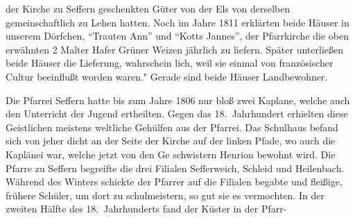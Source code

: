 

der Kirche zu Seffern geschenkten Güter von der Els\ob
von derselben gemeinschaftlich zu Lehen hatten. Noch\ob
im Jahre 1811 erklärten beide Häuser in unserem\ob
Dörfchen, \enquote{Trauten Ann} und \enquote{Kotts Jannes},\ob
der Pfarrkirche die oben erwähnten 2 Malter Hafer\ob
Grüner Weizen jährlich zu liefern. Später\ob
unterließen beide Häuser die Lieferung, wahrschein\ohb
lich, weil sie einmal von französischer Cultur beeinflußt\ob
worden waren." Gerade sind beide Häuser Landbewohner\unsicher.

\pend
{}
\pstart

Die Pfarrei Seffern hatte bis zum Jahre 1806 nur bloß\ob
zwei Kaplane, welche auch den Unterricht der Jugend\ob
{}%
ertheilten. Gegen das 18.\ Jahrhundert erhielten\ob
diese Geistlichen meistens weltliche Gehülfen aus der\ob
Pfarrei. Das Schulhaus befand sich von jeher dicht\ob
an der Seite der Kirche auf der linken Pfade, wo\ob
auch die Kaplänei war, welche jetzt von den Ge\ohb
schwistern Henrion bewohnt wird. Die Pfarre zu\ob
Seffern begreifte die drei Filialen Sefferweich,\ob
{}%
Schleid und Heilenbach. Während des Winters\ob
schickte der Pfarrer auf die Filialen begabte und\ob
fleißige, frühere Schüler, um dort zu schulmeistern,\ob
so gut sie es vermochten. In der zweiten Hälfte\ob
des 18.\ Jahrhunderts fand der Küster in der Pfarr-
\pend
